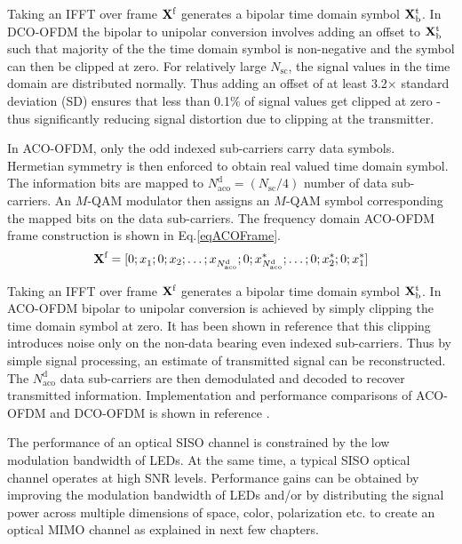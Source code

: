 Taking an IFFT over frame ${\bf{X}}^{\text{f}}$ generates a bipolar time domain symbol ${\bf{X}}_{\text{b}}^{\text{t}}$. In DCO-OFDM the bipolar to unipolar conversion involves adding an offset to ${\bf{X}}_{\text{b}}^{\text{t}}$ such that majority of the the time domain symbol is non-negative and the symbol can then be clipped at zero. For relatively large $N_{\text{sc}}$, the signal values in the time domain are distributed normally. Thus adding an offset of at least 3.2$\times$ standard deviation (SD) ensures that less than 0.1$\%$ of signal values get clipped at zero - thus significantly reducing signal distortion due to clipping at the transmitter.

In ACO-OFDM, only the odd indexed sub-carriers carry data symbols. Hermetian symmetry is then enforced to obtain real valued time domain symbol. The information bits are mapped to $N_{\text{aco}}^{\text{d}} = (N_{\text{sc}}/4)$ number of data sub-carriers. An $M$-QAM modulator then assigns an $M$-QAM symbol corresponding the mapped bits on the data sub-carriers. The frequency domain ACO-OFDM frame construction is shown in Eq.\eqref{eqACOFrame}. 
\begin{equation}
	{\bf{X}}^{\text{f}} = [0; x_{1}^{ }; 0; x_{2}; \ldots; x_{N_{\text{aco}}^{\text{d}}}^{ }; 0; x_{N_{\text{aco}}^{\text{d}}}^{*}; \ldots; 0; x_{2}^{*}; 0; x_{1}^{*}]
\label{eqACOFrame}
\end{equation}

Taking an IFFT over frame ${\bf{X}}^{\text{f}}$ generates a bipolar time domain symbol ${\bf{X}}_{\text{b}}^{\text{t}}$. In ACO-OFDM bipolar to unipolar conversion is achieved by simply clipping the time domain symbol at zero. It has been shown in reference \cite{arm06a} that this clipping introduces noise only on the non-data bearing even indexed sub-carriers. Thus by simple signal processing, an estimate of transmitted signal can be reconstructed. The $N_{\text{aco}}^{\text{d}}$ data sub-carriers are then demodulated and decoded to recover transmitted information. Implementation and performance comparisons of ACO-OFDM and DCO-OFDM is shown in reference \cite{mes11a}.

The performance of an optical SISO channel is constrained by the low modulation bandwidth of LEDs. At the same time, a typical SISO optical channel operates at high SNR levels. Performance gains can be obtained by improving the modulation bandwidth of LEDs and/or by distributing the signal power across multiple dimensions of space, color, polarization etc. to create an optical MIMO channel as explained in next few chapters.
